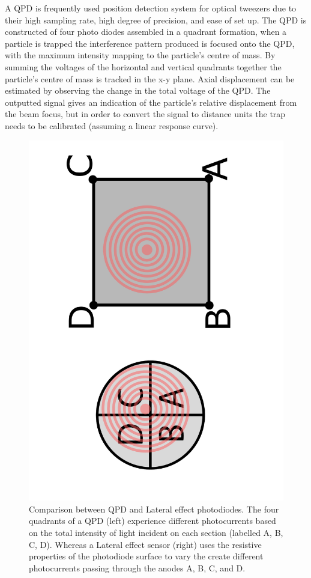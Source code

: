 A QPD is frequently used position detection system for optical 
tweezers due to their high sampling rate, high degree of 
precision, and ease of set up. The QPD is constructed of four photo 
diodes assembled in a quadrant formation, when a particle is trapped the 
interference pattern produced is focused onto the QPD, with 
the maximum intensity mapping to the particle's centre of mass. 
By summing the voltages of the horizontal and vertical quadrants 
together the particle's centre of mass is tracked in the x-y 
plane. Axial displacement can be estimated by observing the change
in the total voltage of the QPD. The outputted signal gives an
indication of the particle's relative displacement from the beam 
focus, but in order to convert the signal to distance units the
trap needs to be calibrated (assuming a linear response curve).

\begin{figure}[h!]
	\centering
	\includegraphics[height=\linewidth, angle=270]{QPD_Lateral_effect.pdf}
	\caption{Comparison between QPD and Lateral effect photodiodes.
	The four quadrants of a QPD (left) experience different photocurrents
	based on the total intensity of light incident on each section 
	(labelled A, B, C, D). 
	Whereas a Lateral effect sensor (right) uses the resistive properties
	of the photodiode surface to vary the create different photocurrents 
	passing through the anodes A, B, C, and D.}
\end{figure}


